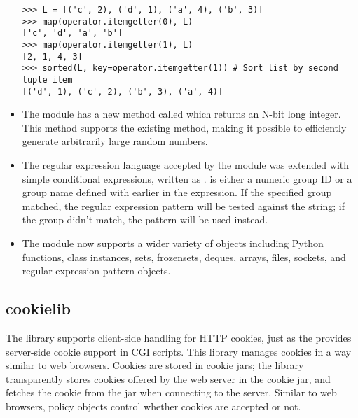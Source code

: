 \documentclass{howto}
\begin{document}
\begin{itemize}
\begin{verbatim}
>>> L = [('c', 2), ('d', 1), ('a', 4), ('b', 3)]
>>> map(operator.itemgetter(0), L)
['c', 'd', 'a', 'b']
>>> map(operator.itemgetter(1), L)
[2, 1, 4, 3]
>>> sorted(L, key=operator.itemgetter(1)) # Sort list by second tuple item
[('d', 1), ('c', 2), ('b', 3), ('a', 4)]
\end{verbatim}

\item The  module has a new method called  
   which returns an N-bit long integer.  This method supports the existing
    method, making it possible to efficiently generate
   arbitrarily large random numbers.

\item The regular expression language accepted by the  module
   was extended with simple conditional expressions, written as
   .   is either a
   numeric group ID or a group name defined with  
   earlier in the expression.  If the specified group matched, the
   regular expression pattern  will be tested against the string; if
   the group didn't match, the pattern  will be used instead.

\item The  module now supports a wider variety of objects
   including Python functions, class instances, sets, frozensets, deques,
   arrays, files, sockets, and regular expression pattern objects.
   
\end{itemize}



\subsection{cookielib}

The  library supports client-side handling for HTTP
cookies, just as the  provides server-side cookie
support in CGI scripts. This library manages cookies in a way similar
to web browsers. Cookies are stored in cookie jars; the library
transparently stores cookies offered by the web server in the cookie
jar, and fetches the cookie from the jar when connecting to the
server. Similar to web browsers, policy objects control whether
cookies are accepted or not.
\end{document}

